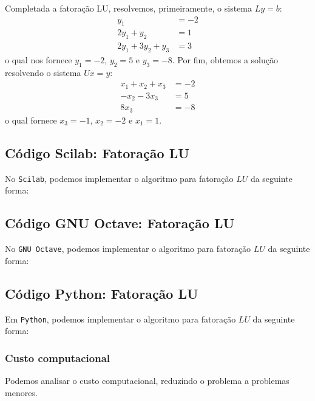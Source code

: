 \begin{sol}
Completada a fatoração LU, resolvemos, primeiramente, o sistema $Ly = b$:
\begin{equation}
  \begin{split}
    y_1 &= -2\\
    2y_1 + y_2 &= 1\\
    2y_1 + 3y_2 + y_3 &= 3
  \end{split}
\end{equation}
o qual nos fornece $y_1 = -2$, $y_2 = 5$ e $y_3 = -8$. Por fim, obtemos a solução resolvendo o sistema $Ux = y$:
\begin{equation}
  \begin{split}
  x_1 + x_2 + x_3 &= -2\\
  -x_2 - 3x_3 &= 5\\
  8x_3 &= -8
  \end{split}
\end{equation}
o qual fornece $x_3 = -1$, $x_2 = -2$ e $x_1 = 1$.
\end{sol}

\ifisscilab
\subsection{Código Scilab: Fatoração LU}
No \verb+Scilab+, podemos implementar o algoritmo para fatoração $LU$ da seguinte forma:
%

\fi
\ifisoctave
\subsection{Código GNU Octave: Fatoração LU}
No \verb+GNU Octave+, podemos implementar o algoritmo para fatoração $LU$ da seguinte forma:

\fi
\ifispython
\subsection{Código Python: Fatoração LU}
Em \verb+Python+, podemos implementar o algoritmo para fatoração $LU$ da seguinte forma:

\fi

\ifisscilab
\subsubsection{Custo computacional}
Podemos analisar o custo computacional, reduzindo o problema a problemas menores. %

